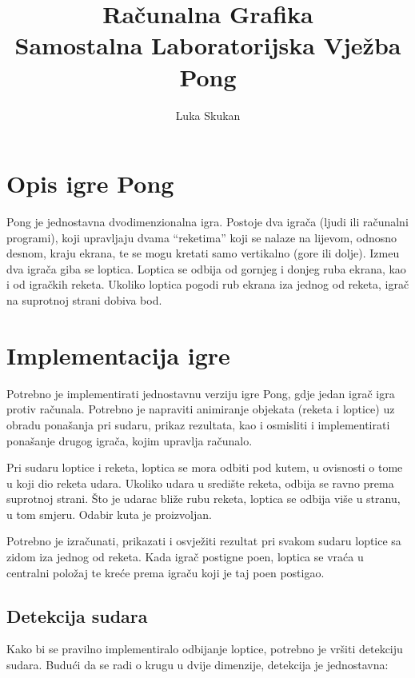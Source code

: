 \documentclass[10pt,a4paper]{article}
\author{Luka Skukan}
\title{Ra\v{c}unalna Grafika\\Samostalna Laboratorijska Vje\v{z}ba\\Pong}
\date{}
\begin{document}
\maketitle

\section{Opis igre Pong}

Pong je jednostavna dvodimenzionalna igra. Postoje dva igra\v{c}a (ljudi ili ra\v{c}unalni programi), koji upravljaju dvama ``reketima'' koji se nalaze na lijevom, odnosno desnom, kraju ekrana, te se mogu kretati samo vertikalno (gore ili dolje). Izme\dj{}u dva igra\v{c}a giba se loptica. Loptica se odbija od gornjeg i donjeg ruba ekrana, kao i od igra\v{c}kih reketa. Ukoliko loptica pogodi rub ekrana iza jednog od reketa, igra\v{c} na suprotnoj strani dobiva bod.

\section{Implementacija igre}

Potrebno je implementirati jednostavnu verziju igre Pong, gdje jedan igra\v{c} igra protiv ra\v{c}unala. Potrebno je napraviti animiranje objekata (reketa i loptice) uz obradu pona\v{s}anja pri sudaru, prikaz rezultata, kao i osmisliti i implementirati pona\v{s}anje drugog igra\v{c}a, kojim upravlja ra\v{c}unalo.

Pri sudaru loptice i reketa, loptica se mora odbiti pod kutem, u ovisnosti o tome u koji dio reketa udara. Ukoliko udara u sredi\v{s}te reketa, odbija se ravno prema suprotnoj strani. \v{S}to je udarac bli\v{z}e rubu reketa, loptica se odbija vi\v{s}e u stranu, u tom smjeru. Odabir kuta je proizvoljan.

Potrebno je izra\v{c}unati, prikazati i osvje\v{z}iti rezultat pri svakom sudaru loptice sa zidom iza jednog od reketa. Kada igra\v{c} postigne poen, loptica se vra\'{c}a u centralni polo\v{z}aj te kre\'{c}e prema igra\v{c}u koji je taj poen postigao.

\subsection{Detekcija sudara}

Kako bi se pravilno implementiralo odbijanje loptice, potrebno je vr\v{s}iti detekciju sudara. Budu\'{c}i da se radi o krugu u dvije dimenzije, detekcija je jednostavna:
\end{document}
